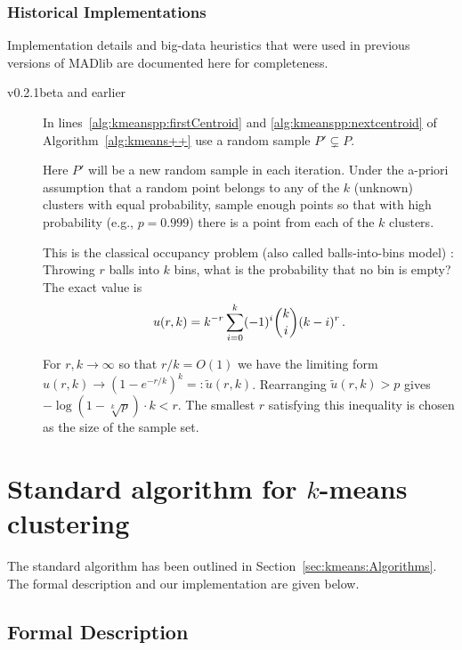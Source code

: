 \documentclass[letterpaper,11pt]{scrreprt}
\numberwithin{equation}{section}
\newcommand{\SiM}{\mathchoice{\,}{}{}{}}
\theoremstyle{algorithm}
\begin{document}
\subsubsection{Historical Implementations}

Implementation details and big-data heuristics that were used in previous versions of MADlib are documented here for completeness.

\begin{description}
	\item[v0.2.1beta and earlier] In lines~\ref{alg:kmeanspp:firstCentroid} and \ref{alg:kmeanspp:nextcentroid} of Algorithm~\ref{alg:kmeans++} use a random sample $P' \subsetneq P$.

		Here $P'$ will be a new random sample in each iteration. Under the a-priori assumption that a random point belongs to any of the $k$ (unknown) clusters with equal probability, sample enough points so that with high probability (e.g., $p = 0.999$) there is a point from each of the $k$ clusters.

		This is the classical occupancy problem (also called balls-into-bins model) \cite{F68a}: Throwing $r$ balls into $k$ bins, what is the probability that no bin is empty? The exact value is
		\begin{align*}
			u(r, k) = k^{-r} \sum_{i=0}^k (-1)^i \binom ki (k - i)^r
			\SiM.
		\end{align*}

		For $r,k \to \infty$ so that $r/k = O(1)$ we have the limiting form $u(r,k) \to (1 - e^{-r/k})^k =: \widetilde u(r, k)$. Rearranging $\widetilde u(r, k) > p$ gives $-\log(1 - \sqrt[k]p) \cdot k < r$. The smallest $r$ satisfying this inequality is chosen as the size of the sample set.
\end{description}

\section[Standard algorithm for k-means clustering]{Standard algorithm for $k$-means clustering}

The standard algorithm has been outlined in Section~\ref{sec:kmeans:Algorithms}. The formal description and our implementation are given below.

\subsection{Formal Description}
\end{document}
